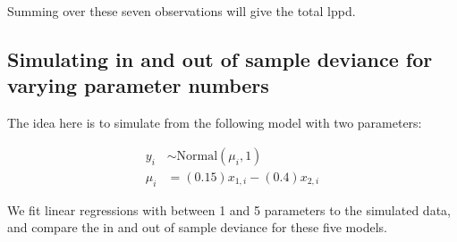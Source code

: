 \documentclass[
]{book}
\begin{document}
Summing over these seven observations will give the total lppd.

\hypertarget{simulating-in-and-out-of-sample-deviance-for-varying-parameter-numbers}{%
\subsection*{Simulating in and out of sample deviance for varying parameter numbers}\label{simulating-in-and-out-of-sample-deviance-for-varying-parameter-numbers}}

The idea here is to simulate from the following model with two parameters:

\[
\begin{aligned}
y_i & \sim \text{Normal}(\mu_i,1) \\
\mu_i &= (0.15)x_{1,i} - (0.4)x_{2,i}
\end{aligned}
\]

We fit linear regressions with between 1 and 5 parameters to the simulated data, and compare the in and out of sample deviance for these five models.
\end{document}
